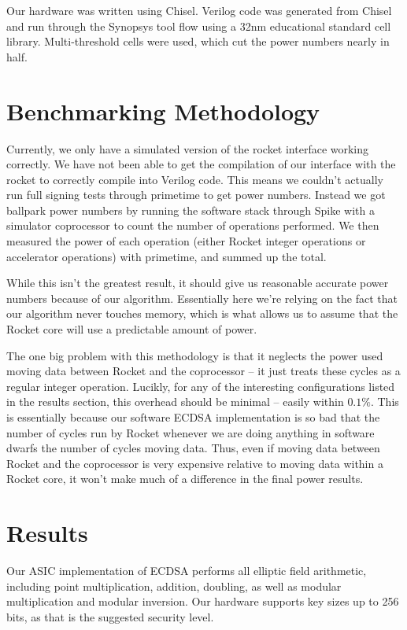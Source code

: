 \documentclass[twocolumn]{article}
\begin{document}
Our hardware was written using Chisel. Verilog code was generated from
Chisel and run through the Synopsys tool flow using a 32nm educational
standard cell library. Multi-threshold cells were used, which cut the
power numbers nearly in half.

\section{Benchmarking Methodology}

Currently, we only have a simulated version of the rocket interface
working correctly.  We have not been able to get the compilation of
our interface with the rocket to correctly compile into Verilog code.
This means we couldn't actually run full signing tests through
primetime to get power numbers.  Instead we got ballpark power numbers
by running the software stack through Spike with a simulator
coprocessor to count the number of operations performed.  We then
measured the power of each operation (either Rocket integer operations
or accelerator operations) with primetime, and summed up the total.

While this isn't the greatest result, it should give us reasonable
accurate power numbers because of our algorithm.  Essentially here
we're relying on the fact that our algorithm never touches memory,
which is what allows us to assume that the Rocket core will use a
predictable amount of power.

The one big problem with this methodology is that it neglects the
power used moving data between Rocket and the coprocessor -- it just
treats these cycles as a regular integer operation.  Lucikly, for any
of the interesting configurations listed in the results section, this
overhead should be minimal -- easily within $0.1\%$.  This is
essentially because our software ECDSA implementation is so bad that
the number of cycles run by Rocket whenever we are doing anything in
software dwarfs the number of cycles moving data.  Thus, even if
moving data between Rocket and the coprocessor is very expensive
relative to moving data within a Rocket core, it won't make much of a
difference in the final power results.

\section{Results}

Our ASIC implementation of ECDSA performs all elliptic field
arithmetic, including point multiplication, addition, doubling, as
well as modular multiplication and modular inversion. Our hardware
supports key sizes up to 256 bits, as that is the suggested security
level.
\end{document}

